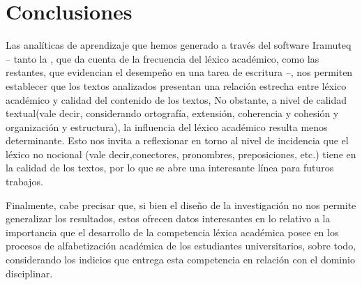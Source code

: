\documentclass{textolivre-html}
\begin{document}
\section{Conclusiones}\label{sec-conclusiones}
Las analíticas de aprendizaje que hemos generado a través del software
Iramuteq – tanto la , que da cuenta de la frecuencia del léxico
académico, como las restantes, que evidencian el desempeño en una tarea de
escritura –, nos permiten establecer que los textos analizados presentan una
relación estrecha entre léxico académico y calidad del contenido de los textos,
No obstante, a nivel de calidad textual(vale decir, considerando ortografía,
extensión, coherencia y cohesión y organización y estructura), la influencia del
léxico académico resulta menos determinante. Esto nos invita a reflexionar en
torno al nivel de incidencia que el léxico no nocional (vale decir,conectores,
pronombres, preposiciones, etc.) tiene en la calidad de los textos, por lo
que se abre una interesante línea para futuros trabajos.

Finalmente, cabe precisar que, si bien el diseño de la investigación no nos
permite generalizar los resultados, estos ofrecen datos interesantes en lo
relativo a la importancia que el desarrollo de la competencia léxica académica
posee en los procesos de alfabetización académica de los estudiantes
universitarios, sobre todo, considerando los indicios que entrega esta
competencia en relación con el dominio disciplinar.


\printbibliography\label{sec-bib}
\end{document}
